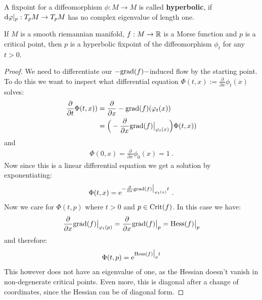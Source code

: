 \begin{definition}
	A fixpoint for a diffeomorphism $\phi:M\to M$ is called \textbf{hyperbolic}, if $\mathop{}\!\mathrm{d} \varphi|_p:T_pM\to T_pM$ has no complex eigenvalue of length one.    
\end{definition}
\begin{remark} \label{rem: critical points are hyperbolic fixpoints}
	If $M$ is a smooth riemannian manifold, $f:M\to \mathbb{R}$ is a Morse function and $p$ is a critical point, then $p$ is a hyperbolic fixpoint of the diffeomorphism $\phi_t$ for any $t>0$.
\end{remark}
\begin{proof}
	We need to differentiate our $-\mathrm{grad}(f)-$induced flow by the starting point. To do this we want to inspect what differential equation $\Phi(t,x):=\frac{\partial}{\partial x}\phi_t(x)$ solves:
	\begin{align*}
		\frac{\partial}{\partial t} \Phi(t,x))   &= \frac{\partial}{\partial x} -\mathrm{grad}(f)(\varphi_t(x)) \\
		&=\Big(-\frac{\partial }{\partial x} \mathrm{grad}(f)\big|_{\varphi_t(x)} \Big) \Phi(t,x))
	\end{align*} and 
	\begin{align*}
		\Phi(0,x)=\frac{\partial}{\partial x}\phi_0(x)=1~.
	\end{align*}
	Now since this is a linear differential equation we get a solution by exponentiating:
	\begin{align*}
		\Phi(t,x)=\mathrm{e}^{-\frac{\partial }{\partial x} \mathrm{grad}(f)\big|_{\varphi_t(x)} t}~.
	\end{align*}
	Now we care for $\Phi(t,p)$ where $t>0$ and $p\in\mathrm{Crit}(f)$. In this case we have:
	\begin{align*}
		\frac{\partial }{\partial x} \mathrm{grad}(f)\big|_{\varphi_t(p)}=\frac{\partial }{\partial x} \mathrm{grad}(f)\big|_{p}=\text{Hess}(f)\big|_p
	\end{align*} and therefore:
	\begin{align*}
		\Phi(t,p)=\mathrm{e} ^{\text{Hess}(f)\big|_p t}
	\end{align*} This however does not have an eigenvalue of one, as the Hessian doesn't vanish in non-degenerate critical points. Even more, this is diagonal after a change of coordinates, since the Hessian can be of diagonal form.
\end{proof}


